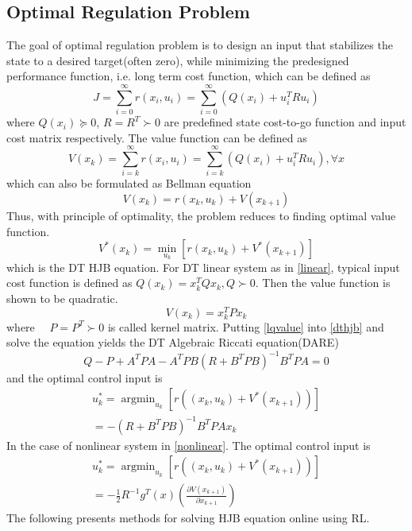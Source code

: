 \documentclass[conference]{IEEEtran}
\DeclareMathOperator*{\argmin}{argmin}
\DeclareMathOperator*{\minimize}{min}
\begin{document}
\subsection{Optimal Regulation Problem}
The goal of optimal regulation problem is to design an input that stabilizes the state to a desired target(often zero), while minimizing the predesigned performance function, i.e. long term cost function, which can be defined as
\begin{equation}
	J = \sum_{i=0}^{\infty}r(x_i, u_i) = \sum_{i=0}^{\infty}(Q(x_i) +u_{i}^{T}Ru_{i})
\end{equation}
where \(Q(x_i)\succeq 0\), \(R=R^T \succ 0\) are predefined state cost-to-go function and input cost matrix respectively. The value function can be defined as
\begin{equation}
	V(x_k) = \sum_{i=k}^{\infty}r(x_i, u_i) = \sum_{i=k}^{\infty}(Q(x_i) +u_{i}^{T}Ru_{i}), \forall x
\end{equation}
which can also be formulated as Bellman equation
\begin{equation}
	V(x_k) = r(x_k, u_k) + V(x_{k+1})\label{cost}
\end{equation}
Thus, with principle of optimality, the problem reduces to finding optimal value function.
\begin{equation}
	V^{*}(x_k) = \minimize_{u_k}[r(x_k, u_k)+V^{*}(x_{k+1})]\label{dthjb}
\end{equation}
which is the DT HJB equation.
For DT linear system as in \eqref{linear}, typical input cost function is defined as \(Q(x_k) = x^{T}_kQx_k, Q \succ 0\). Then the value function is shown to be quadratic.
\begin{equation}
	V(x_k) = x^{T}_kPx_k\label{lqvalue}
\end{equation}
where \( \quad P=P^T \succ 0\) is called kernel matrix. Putting \eqref{lqvalue} into \eqref{dthjb} and solve the equation yields the DT Algebraic Riccati equation(DARE)
\begin{equation}
Q - P + A^{T}PA - A^TPB(R+B^TPB)^{-1}B^TPA = 0\label{dare}
\end{equation}
and the optimal control input is 
\begin{equation}
\begin{split}
	u^{*}_k = \argmin_{u_k}[r((x_k, u_k)+V^{*}(x_{k+1}))]\\
	= -(R+B^TPB)^{-1}B^TPAx_k
\end{split}
\end{equation}
In the case of nonlinear system in \eqref{nonlinear}. The optimal control input is
\begin{equation}
\begin{split}
	u^{*}_k = \argmin_{u_k}[r((x_k, u_k)+V^{*}(x_{k+1}))]\\
	=  -\frac{1}{2}R^{-1}g^{T}(x)(\frac{\partial{V(x_{k+1})}}{\partial{x_{k+1}}})
\end{split}
\end{equation}
The following presents methods for solving HJB equation online using RL.
\end{document}
